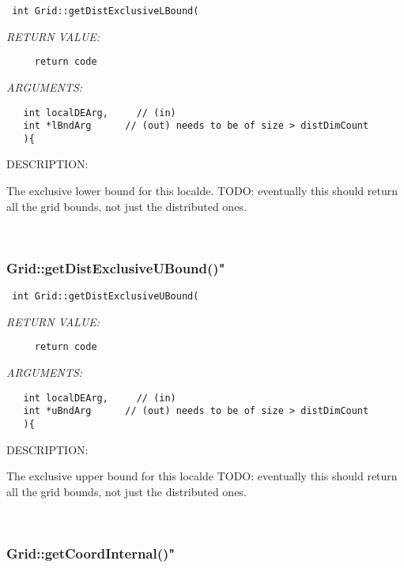   
\begin{verbatim} int Grid::getDistExclusiveLBound(\end{verbatim}{\em RETURN VALUE:}
\begin{verbatim}     return code\end{verbatim}{\em ARGUMENTS:}
\begin{verbatim}   int localDEArg,     // (in)
   int *lBndArg      // (out) needs to be of size > distDimCount
   ){\end{verbatim}
{\sf DESCRIPTION:\\ }


    The exclusive lower bound for this localde.
   TODO: eventually this should return all the grid bounds, not just
         the distributed ones.
   
 
\mbox{}\hrulefill\
 
\subsubsection [Grid::getDistExclusiveUBound()"] {Grid::getDistExclusiveUBound()"}


  
\begin{verbatim} int Grid::getDistExclusiveUBound(\end{verbatim}{\em RETURN VALUE:}
\begin{verbatim}     return code\end{verbatim}{\em ARGUMENTS:}
\begin{verbatim}   int localDEArg,     // (in)
   int *uBndArg      // (out) needs to be of size > distDimCount
   ){\end{verbatim}
{\sf DESCRIPTION:\\ }


    The exclusive upper bound for this localde
   TODO: eventually this should return all the grid bounds, not just
         the distributed ones.
   
 
\mbox{}\hrulefill\
 
\subsubsection [Grid::getCoordInternal()"] {Grid::getCoordInternal()"}


